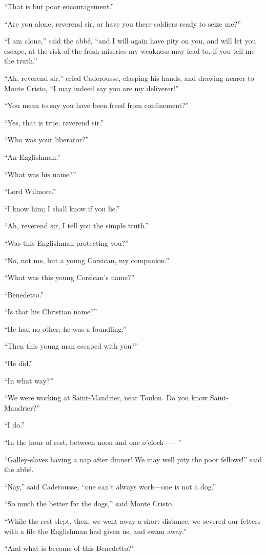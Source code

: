 “That is but poor encouragement.”

“Are you alone, reverend sir, or have you there soldiers ready to seize
me?”

“I am alone,” said the abbé, “and I will again have pity on you, and
will let you escape, at the risk of the fresh miseries my weakness may
lead to, if you tell me the truth.”

“Ah, reverend sir,” cried Caderousse, clasping his hands, and drawing
nearer to Monte Cristo, “I may indeed say you are my deliverer!”

“You mean to say you have been freed from confinement?”

“Yes, that is true, reverend sir.”

“Who was your liberator?”

“An Englishman.”

“What was his name?”

“Lord Wilmore.”

“I know him; I shall know if you lie.”

“Ah, reverend sir, I tell you the simple truth.”

“Was this Englishman protecting you?”

“No, not me, but a young Corsican, my companion.”

“What was this young Corsican’s name?”

“Benedetto.”

“Is that his Christian name?”

“He had no other; he was a foundling.”

“Then this young man escaped with you?”

“He did.”

“In what way?”

“We were working at Saint-Mandrier, near Toulon. Do you know
Saint-Mandrier?”

“I do.”

“In the hour of rest, between noon and one o’clock——”

“Galley-slaves having a nap after dinner! We may well pity the poor
fellows!” said the abbé.

“Nay,” said Caderousse, “one can’t always work—one is not a dog.”

“So much the better for the dogs,” said Monte Cristo.

“While the rest slept, then, we went away a short distance; we severed
our fetters with a file the Englishman had given us, and swam away.”

“And what is become of this Benedetto?”

